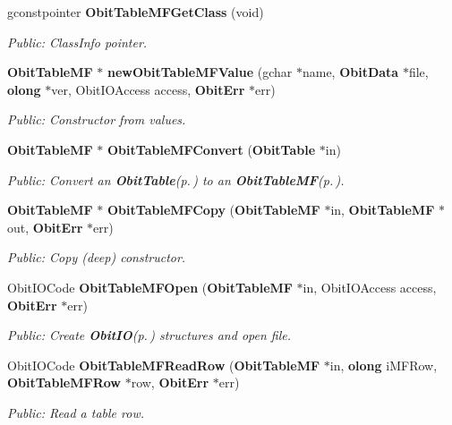 \begin{CompactItemize}
gconstpointer {\bf Obit\-Table\-MFGet\-Class} (void)
\begin{CompactList}\small\item\em Public: Class\-Info pointer. \item\end{CompactList}\item 
{\bf Obit\-Table\-MF} $\ast$ {\bf new\-Obit\-Table\-MFValue} (gchar $\ast$name, {\bf Obit\-Data} $\ast$file, {\bf olong} $\ast$ver, Obit\-IOAccess access, {\bf Obit\-Err} $\ast$err)
\begin{CompactList}\small\item\em Public: Constructor from values. \item\end{CompactList}\item 
{\bf Obit\-Table\-MF} $\ast$ {\bf Obit\-Table\-MFConvert} ({\bf Obit\-Table} $\ast$in)
\begin{CompactList}\small\item\em Public: Convert an {\bf Obit\-Table}{\rm (p.\,\pageref{structObitTable})} to an {\bf Obit\-Table\-MF}{\rm (p.\,\pageref{structObitTableMF})}. \item\end{CompactList}\item 
{\bf Obit\-Table\-MF} $\ast$ {\bf Obit\-Table\-MFCopy} ({\bf Obit\-Table\-MF} $\ast$in, {\bf Obit\-Table\-MF} $\ast$out, {\bf Obit\-Err} $\ast$err)
\begin{CompactList}\small\item\em Public: Copy (deep) constructor. \item\end{CompactList}\item 
Obit\-IOCode {\bf Obit\-Table\-MFOpen} ({\bf Obit\-Table\-MF} $\ast$in, Obit\-IOAccess access, {\bf Obit\-Err} $\ast$err)
\begin{CompactList}\small\item\em Public: Create {\bf Obit\-IO}{\rm (p.\,\pageref{structObitIO})} structures and open file. \item\end{CompactList}\item 
Obit\-IOCode {\bf Obit\-Table\-MFRead\-Row} ({\bf Obit\-Table\-MF} $\ast$in, {\bf olong} i\-MFRow, {\bf Obit\-Table\-MFRow} $\ast$row, {\bf Obit\-Err} $\ast$err)
\begin{CompactList}\small\item\em Public: Read a table row. \item\end{CompactList}\item 

\end{CompactItemize}
